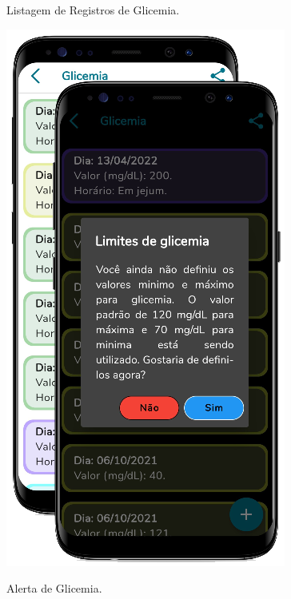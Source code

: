 \begin{figure}[htb]
    \centering
    \begin{minipage}{0.5\textwidth}
        \centering
        \caption{Listagem de Registros de Glicemia.}\label{fig_list_glicemia}
        \includegraphics[scale=0.6]{Imagens/desenvolvimento/app/list_glicemia.png}
    \end{minipage}
    \hfill
    \begin{minipage}{0.45\textwidth}
        \centering
        \caption{Alerta de Glicemia.}\label{fig_alerta_glicemia}

\end{minipage}
\end{figure}
